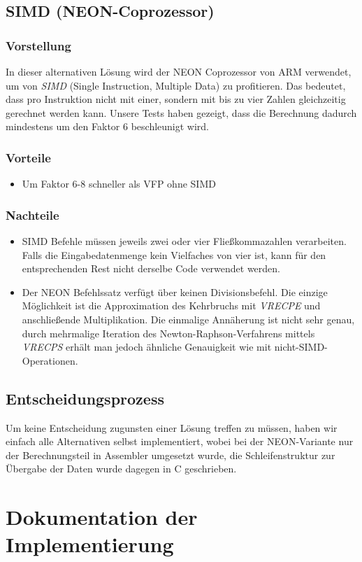\documentclass[11pt]{scrartcl}
\begin{document}
\subsection{SIMD (NEON-Coprozessor)}
\subsubsection*{Vorstellung}
In dieser alternativen Lösung wird der NEON Coprozessor von ARM verwendet, um von \emph{SIMD} (Single Instruction, Multiple Data)
zu profitieren. Das bedeutet, dass pro Instruktion nicht mit einer, sondern mit bis zu vier Zahlen gleichzeitig gerechnet werden kann. Unsere Tests haben gezeigt, dass die Berechnung dadurch mindestens um den Faktor 6 beschleunigt wird.
\subsubsection*{Vorteile}
\begin{itemize}
\item Um Faktor 6-8 schneller als VFP ohne SIMD
\end{itemize}
\subsubsection*{Nachteile}
\begin{itemize}
\item SIMD Befehle müssen jeweils zwei oder vier Fließkommazahlen verarbeiten. Falls die Eingabedatenmenge kein Vielfaches von vier ist, kann für den entsprechenden Rest nicht derselbe Code verwendet werden.
\item Der NEON Befehlssatz verfügt über keinen Divisionsbefehl. Die einzige Möglichkeit ist die Approximation des Kehrbruchs mit \emph{VRECPE} und anschließende Multiplikation.
Die einmalige Annäherung ist nicht sehr genau, durch mehrmalige Iteration des Newton-Raphson-Verfahrens mittels \emph{VRECPS} erhält man jedoch ähnliche Genauigkeit wie mit nicht-SIMD-Operationen.
\end{itemize}
\subsection{Entscheidungsprozess}
Um keine Entscheidung zugunsten einer Lösung treffen zu müssen, haben wir einfach alle Alternativen selbst implementiert, wobei bei der NEON-Variante nur der Berechnungsteil in Assembler umgesetzt wurde, die Schleifenstruktur zur Übergabe der Daten wurde dagegen in C geschrieben.
\section{Dokumentation der Implementierung}
\end{document}
